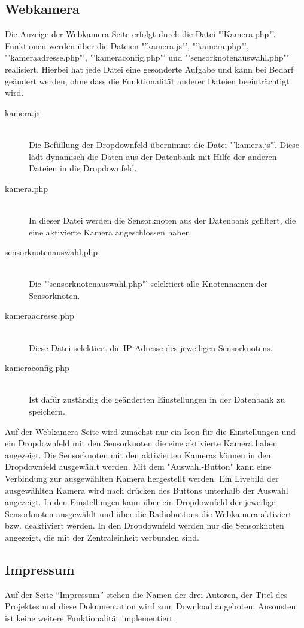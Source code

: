 \subsection{Webkamera}\label{Webkamera}
Die Anzeige der Webkamera Seite erfolgt durch die Datei "'Kamera.php"'. Funktionen werden über die Dateien "'kamera.js"', "'kamera.php"', "'kameraadresse.php"',  "'kameraconfig.php"' und "'sensorknotenauswahl.php"' realisiert. Hierbei hat jede Datei eine gesonderte Aufgabe und kann bei Bedarf geändert werden, ohne dass die Funktionalität anderer Dateien beeinträchtigt wird.
\begin{description}
	\item[kamera.js] \hfill \\
	Die Befüllung der Dropdownfeld übernimmt die Datei "'kamera.js"'. Diese lädt dynamisch die Daten aus der Datenbank mit Hilfe der anderen Dateien in die  Dropdownfeld.
	\item[kamera.php] \hfill \\
	In dieser Datei werden die Sensorknoten aus der Datenbank gefiltert, die eine aktivierte Kamera angeschlossen haben.
	\item[sensorknotenauswahl.php] \hfill \\
	Die "'sensorknotenauswahl.php"' selektiert alle Knotennamen der Sensorknoten.
	\item[kameraadresse.php] \hfill \\
	Diese Datei selektiert die IP-Adresse des jeweiligen Sensorknotens.
	\item[kameraconfig.php] \hfill \\
	Ist dafür zuständig die geänderten Einstellungen in der Datenbank zu speichern.
\end{description}
Auf der Webkamera Seite wird zunächst nur ein Icon für die Einstellungen und ein Dropdownfeld mit den Sensorknoten die eine aktivierte Kamera haben angezeigt. Die Sensorknoten mit den aktivierten Kameras können in dem Dropdownfeld ausgewählt werden. Mit dem "Auswahl-Button" kann eine Verbindung zur ausgewählten Kamera hergestellt werden. Ein Livebild der ausgewählten Kamera wird nach drücken des Buttons unterhalb der Auswahl angezeigt. In den Einstellungen kann über ein Dropdownfeld der jeweilige Sensorknoten ausgewählt und über die Radiobuttons die Webkamera aktiviert bzw. deaktiviert werden. In den Dropdownfeld werden nur die Sensorknoten angezeigt, die mit der Zentraleinheit verbunden sind. 
\subsection{Impressum}

Auf der Seite "`Impressum"' stehen die Namen der drei Autoren, der Titel des Projektes und diese Dokumentation wird zum Download angeboten. Ansonsten ist keine weitere Funktionalität implementiert. 